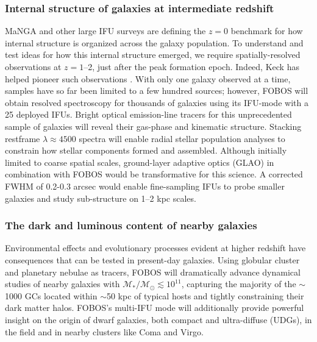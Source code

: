 \subsubsection{Internal structure of galaxies at intermediate redshift}

MaNGA \citep{bundy15} and other large IFU surveys are defining the
$z=0$ benchmark for how internal structure is organized across the
galaxy population. To understand and test ideas for how this internal
structure emerged, we require spatially-resolved observations at $z =
1$--2, just after the peak formation epoch. Indeed, Keck has
helped pioneer such observations \citep[e.g.,][]{erb04, miller11,law09}.
With only one galaxy observed at a time, samples have so far been limited to a few hundred sources; however,
FOBOS will obtain resolved spectroscopy for thousands of galaxies
using its IFU-mode with a 25 deployed IFUs. Bright optical emission-line tracers
for this unprecedented sample of galaxies will reveal their gas-phase
and kinematic structure. Stacking restframe $\lambda \approx 4500$
spectra will enable radial stellar population analyses to constrain
how stellar components formed and assembled. Although initially
limited to coarse spatial scales, ground-layer adaptive optics (GLAO)
in combination with FOBOS would be transformative for this science. A
corrected FWHM of 0.2-0.3 arcsec would enable fine-sampling IFUs to
probe smaller galaxies and study sub-structure on 1--2 kpc scales.


\subsubsection{The dark and luminous content of nearby galaxies}

Environmental effects and evolutionary processes evident at higher redshift have consequences that can be tested in present-day galaxies.  Using globular cluster and planetary nebulae as tracers, FOBOS will
dramatically advance dynamical studies of nearby galaxies with
$\mathcal{M_\ast/M_\odot} \lesssim 10^{11}$, capturing the majority
of the $\sim$1000 GCs located within $\sim$50 kpc of typical hosts
\citep[see][]{2013ApJ...772...82H} and tightly constraining their
dark matter halos. FOBOS's multi-IFU mode will additionally provide
powerful insight on the origin of dwarf galaxies, both compact and
ultra-diffuse (UDGs), in the field and in nearby clusters like Coma
and Virgo.


